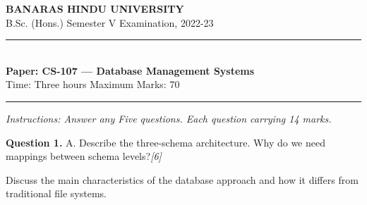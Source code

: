 \documentclass[11pt,a4paper]{article}
\newcommand{\pts}[1]{\hfill\textit{[#1]}}
\begin{document}
\begin{center}
  {\large\bfseries BANARAS HINDU UNIVERSITY}\\[2pt]
  {\normalsize B.Sc. (Hons.) Semester V Examination, 2022-23}\\[6pt]
  \rule{0.8\linewidth}{0.5pt}\\[6pt]
  {\large\bfseries Paper: CS-107 --- Database Management Systems}\\[4pt]
  {\normalsize Time: Three hours \hfill Maximum Marks: 70}
\end{center}

\rule{\linewidth}{0.4pt}

\smallskip
\noindent\textit{Instructions: Answer any Five questions. Each question carrying 14 marks.}

\bigskip

\medskip\noindent\textbf{Question 1.} A. Describe the three-schema architecture. Why do we need mappings between schema levels?\pts{6}
\begin{parts}
  \item Discuss the main characteristics of the database approach and how it differs from traditional file systems.
\end{parts}
\end{document}
